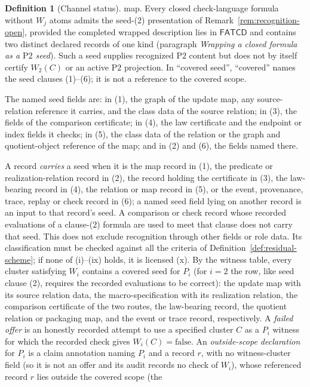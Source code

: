\documentclass[11pt]{article}
\theoremstyle{definition}
\newtheorem{definition}[theorem]{Definition}
\newcommand{\FATCD}{\ensuremath{\mathsf{FATCD}}}
\newcommand{\Ptwo}{\ensuremath{\mathrm{P2}}}
\begin{document}
\begin{definition}[Channel status]
map. Every closed check-language formula without \(W_j\) atoms admits the
seed-(2) presentation of Remark~\ref{rem:recognition-open}, provided the completed wrapped description lies in \FATCD{} and contains two distinct
declared records of one kind (paragraph \emph{Wrapping a closed formula as a \Ptwo{} seed}). Such a seed
supplies recognized \Ptwo{} content but does not by itself certify \(W_2(C)\) or
an active \Ptwo{} projection. In ``covered seed'', ``covered''
names the seed clauses (1)--(6); it is not a reference to the covered scope.
\par The named seed fields are: in (1), the graph of the update map, any
source-relation reference it carries, and the class data of the source
relation; in (3), the
fields of the comparison certificate; in (4), the law certificate and the
endpoint or index fields it checks; in (5), the class data of the relation or
the graph and quotient-object reference of the map; and in (2) and (6), the
fields named there.
\par A record \emph{carries} a seed when it is the map record in
(1), the predicate or realization-relation record in (2), the record holding
the certificate in (3), the law-bearing record in (4), the relation or map
record in (5), or the event, provenance, trace, replay or check record in (6);
a named seed field lying on another record is an input to that record's
seed. A comparison or check record whose recorded evaluations of a clause-(2) formula are used to meet that clause does not carry that seed. This does not exclude recognition through other fields or role data. Its classification must be checked against all the criteria of Definition~\ref{def:residual-scheme}; if none of (i)--(ix) holds, it is licensed (x). By the witness table, every cluster satisfying \(W_i\) contains a
covered seed for \(P_i\) (for \(i=2\) the row, like seed clause (2), requires the recorded evaluations
to be correct): the update map with its source relation data, the
macro-specification with its realization relation, the comparison certificate
of the two routes, the law-bearing record, the quotient relation or packaging
map, and the event or trace record, respectively. A \emph{failed offer} is an
honestly recorded attempt to use a specified cluster \(C\) as a \(P_i\)
witness for which the recorded check gives \(W_i(C)=\mathrm{false}\). An \emph{outside-scope declaration} for \(P_i\) is a claim annotation naming
\(P_i\) and a record \(r\), with no witness-cluster field (so it is not an offer
and its audit records no check of \(W_i\)), whose referenced record \(r\) lies outside the covered scope (the

\end{definition}
\end{document}
